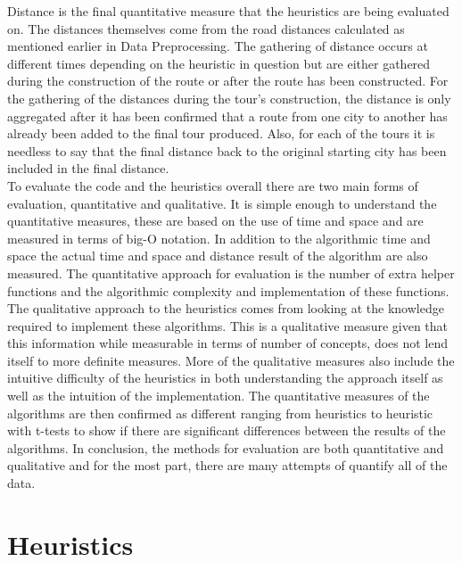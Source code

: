 \documentclass[midd]{thesis}
\newcommand{\tab}{\hspace*{2em}}
\begin{document}
\tab Distance is the final quantitative measure that the heuristics are being evaluated on. The distances themselves come from the road distances calculated as mentioned earlier in Data Preprocessing. The gathering of distance occurs at different times depending on the heuristic in question but are either gathered during the construction of the route or after the route has been constructed. For the gathering of the distances during the tour's construction, the distance is only aggregated after it has been confirmed that a route from one city to another has already been added to the final tour produced. Also, for each of the tours it is needless to say that the final distance back to the original starting city has been included in the final distance.\\
\tab To evaluate the code and the heuristics overall there are two main forms of evaluation, quantitative and qualitative. It is simple enough to understand the quantitative measures, these are based on the use of time and space and are measured in terms of big-O notation. In addition to the algorithmic time and space the actual time and space and distance result of the algorithm are also measured. The quantitative approach for evaluation is the number of extra helper functions and the algorithmic complexity and implementation of these functions. The qualitative approach to the heuristics comes from looking at the knowledge required to implement these algorithms. This is a qualitative measure given that this information while measurable in terms of number of concepts, does not lend itself to more definite measures. More of the qualitative measures also include the intuitive difficulty of the heuristics in both understanding the approach itself as well as the intuition of the implementation. The quantitative measures of the algorithms are then confirmed as different ranging from heuristics to heuristic with t-tests to show if there are significant differences between the results of the algorithms. In conclusion, the methods for evaluation are both quantitative and qualitative and for the most part, there are many attempts of quantify all of the data.

\chapter{Heuristics}
\end{document}
